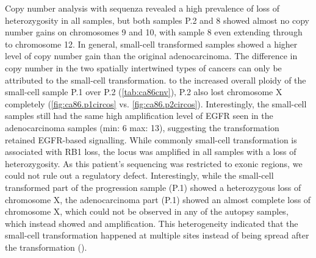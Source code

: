 Copy number analysis with sequenza revealed a high prevalence of loss of heterozygosity in all samples, but both samples P.2 and 8 showed almost no copy number gains on chromosomes 9 and 10, with sample 8 even extending through to chromosome 12. In general, small-cell transformed samples showed a higher level of copy number gain than the original adenocarcinoma. The difference in copy number in the two spatially intertwined types of cancers can only be attributed to the small-cell transformation.  to the increased overall ploidy of the small-cell sample P.1 over P.2 (\autoref{tab:ca86cnv}), P.2 also lost chromosome X completely  (\autoref{fig:ca86.p1circos} vs. \autoref{fig:ca86.p2circos}). Interestingly, the small-cell samples still had the same high amplification level of EGFR seen in the adenocarcinoma samples (min: 6 max: 13), suggesting the transformation retained EGFR-based signalling. While commonly small-cell transformation is associated with RB1 loss, the locus was amplified in all samples with a loss of heterozygosity. As this patient's sequencing was restricted to exonic regions, we could not rule out a regulatory defect. Interestingly, while the small-cell transformed part of the progression sample (P.1) showed a heterozygous loss of chromosome X, the adenocarcinoma part (P.1) showed an almost complete loss of chromosome X, which could not be observed in any of the autopsy samples, which instead showed and amplification. This heterogeneity indicated that the small-cell transformation happened at multiple sites instead of being spread after the transformation ().

